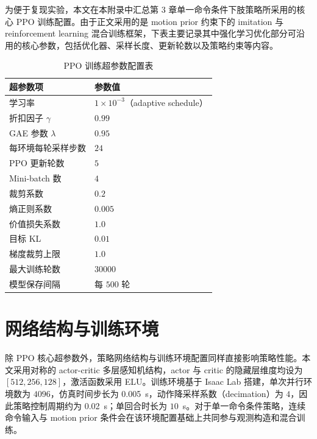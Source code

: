 为便于复现实验，本文在本附录中汇总第 3 章单一命令条件下肢策略所采用的核心 PPO 训练配置。由于正文采用的是 motion prior 约束下的 imitation 与 reinforcement learning 混合训练框架，下表主要记录其中强化学习优化部分可沿用的核心参数，包括优化器、采样长度、更新轮数以及策略约束等内容。

\begin{table}[htbp]
  \centering
  \caption{PPO 训练超参数配置表}
  \label{tab:ppo-hparams}
  \begin{tabular}{ll}
    \toprule
    超参数项 & 参数值 \\
    \midrule
    学习率 & $1\times10^{-3}$（adaptive schedule）\\
    折扣因子 $\gamma$ & $0.99$ \\
    GAE 参数 $\lambda$ & $0.95$ \\
    每环境每轮采样步数 & $24$ \\
    PPO 更新轮数 & $5$ \\
    Mini-batch 数 & $4$ \\
    裁剪系数 & $0.2$ \\
    熵正则系数 & $0.005$ \\
    价值损失系数 & $1.0$ \\
    目标 KL & $0.01$ \\
    梯度裁剪上限 & $1.0$ \\
    最大训练轮数 & $30000$ \\
    模型保存间隔 & 每 $500$ 轮 \\
    \bottomrule
  \end{tabular}
\end{table}

\section{网络结构与训练环境}

除 PPO 核心超参数外，策略网络结构与训练环境配置同样直接影响策略性能。本文采用对称的 actor-critic 多层感知机结构，actor 与 critic 的隐藏层维度均设为 $[512,256,128]$，激活函数采用 ELU。训练环境基于 Isaac Lab 搭建，单次并行环境数为 $4096$，仿真时间步长为 \SI{0.005}{s}，动作降采样系数（decimation）为 $4$，因此策略控制周期约为 \SI{0.02}{s}；单回合时长为 $10$~s。对于单一命令条件策略，连续命令输入与 motion prior 条件会在该环境配置基础上共同参与观测构造和混合训练。


